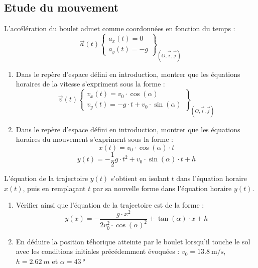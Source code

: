 \documentclass[a4paper,12pt,fleqn]{article}%
\begin{document}
\subsection{Etude du mouvement}
L'accélération du boulet admet comme coordonnées en fonction du temps :
$$ \vec{a}(t)\left\{
    \begin{array}{c}
        a_x(t) = 0\\
        a_y(t) = -g
    \end{array}
\right\}_{(O,\vec{i},\vec{j})}$$
\begin{enumerate}
    \item Dans le repère d'espace défini en introduction, montrer que les équations horaires de la vitesse s'expriment sous la forme : $$ \vec{v}(t)\left\{
        \begin{array}{c}
            v_x(t) = v_0 \cdot \cos(\alpha)\\
            v_y(t) = -g \cdot t + v_0 \cdot \sin(\alpha)
        \end{array}
    \right\}_{(O,\vec{i},\vec{j})}$$
    \item Dans le repère d'espace défini en introduction, montrer que les équations horaires du mouvement s'expriment sous la forme : $$ x(t) = v_0 \cdot \cos(\alpha) \cdot t$$ $$ y(t) = -\frac{1}{2} g \cdot t^2 + v_0 \cdot \sin(\alpha) \cdot t +h$$
\end{enumerate}
L'équation de la trajectoire $y(t)$ s'obtient en isolant $t$ dans l'équation horaire $x(t)$, puis en remplaçant $t$ par sa nouvelle forme dans l'équation horaire $y(t)$.
\begin{enumerate}[resume]
    \item Vérifier ainsi que l'équation de la trajectoire est de la forme : $$ y(x) = -\dfrac{g \cdot x^2}{2v_0^2\cdot \cos(\alpha)^2} + \tan(\alpha) \cdot x + h$$
    \item En déduire la position téhorique atteinte par le boulet lorsqu'il touche le sol avec les conditions initiales précédemment évoquées : $v_0 = \SI{13,8}{\meter\per\second}$, $h = \SI{2,62}{m}$ et $\alpha = \SI{43}{\degree}$
\end{enumerate}
\end{document}
